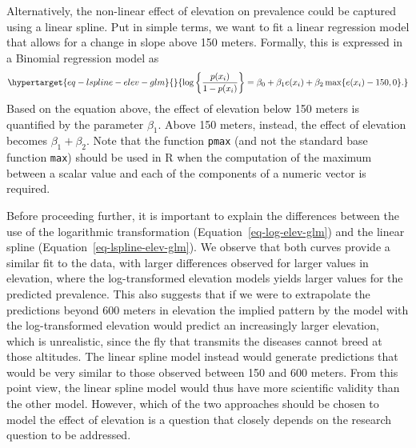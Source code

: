 \documentclass[
  letterpaper,
]{krantz}
\begin{document}
Alternatively, the non-linear effect of elevation on prevalence could be
captured using a linear spline. Put in simple terms, we want to fit a
linear regression model that allows for a change in slope above 150
meters. Formally, this is expressed in a Binomial regression model as
\begin{equation}\protect\hypertarget{eq-lspline-elev-glm}{}{
\log\left\{\frac{p(x_i)}{1-p(x_i)}\right\} = \beta_0 + \beta_1 e(x_i) + \beta_{2} \max\{e(x_i)-150, 0\}.
}\label{eq-lspline-elev-glm}\end{equation} Based on the equation above,
the effect of elevation below 150 meters is quantified by the parameter
\(\beta_1\). Above 150 meters, instead, the effect of elevation becomes
\(\beta_1 + \beta_2\). Note that the function \texttt{pmax} (and not the
standard base function \texttt{max}) should be used in R when the
computation of the maximum between a scalar value and each of the
components of a numeric vector is required.

Before proceeding further, it is important to explain the differences
between the use of the logarithmic transformation
(Equation~\ref{eq-log-elev-glm}) and the linear spline
(Equation~\ref{eq-lspline-elev-glm}). We observe that both curves
provide a similar fit to the data, with larger differences observed for
larger values in elevation, where the log-transformed elevation models
yields larger values for the predicted prevalence. This also suggests
that if we were to extrapolate the predictions beyond 600 meters in
elevation the implied pattern by the model with the log-transformed
elevation would predict an increasingly larger elevation, which is
unrealistic, since the fly that transmits the diseases cannot breed at
those altitudes. The linear spline model instead would generate
predictions that would be very similar to those observed between 150 and
600 meters. From this point view, the linear spline model would thus
have more scientific validity than the other model. However, which of
the two approaches should be chosen to model the effect of elevation is
a question that closely depends on the research question to be
addressed.
\end{document}
